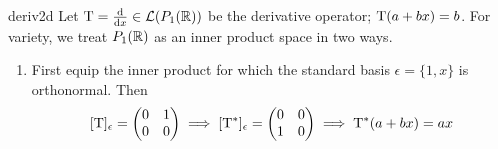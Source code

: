 \begin{examples}{}{deriv2d}
	Let $\mathrm{T}=\frac{\mathrm{d} }{\mathrm{d} x}\in\mathcal{L}(P_1(\mathbb{R}))$ be the derivative operator; $\mathrm{T}(a+bx)=b$. For variety, we treat $P_1(\mathbb{R})$ as an inner product space in two ways.
	\begin{enumerate}
	  \item First equip the inner product for which the standard basis $\epsilon=\{1,x\}$ is orthonormal. Then
	  \[
	  	[\mathrm{T}]_\epsilon=
		  \begin{pmatrix}
		  	0&1\\
		  	0&0
		  \end{pmatrix}
		  \implies [\mathrm{T}^*]_\epsilon=
		  \begin{pmatrix}
		  	0&0\\
		  	1&0
		  \end{pmatrix}
		  \implies \mathrm{T}^*(a+bx)=ax
		\]
	  

\end{enumerate}
\end{examples}
